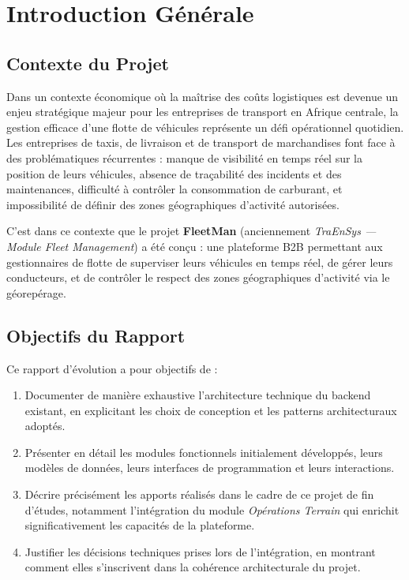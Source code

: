 \documentclass[12pt,a4paper]{report}
\begin{document}
\tableofcontents
\listoftables
\listoffigures

\chapter*{Introduction Générale}
\thispagestyle{fancy}

\section*{Contexte du Projet}

Dans un contexte économique où la maîtrise des coûts logistiques est devenue un enjeu stratégique majeur pour les entreprises de transport en Afrique centrale, la gestion efficace d'une flotte de véhicules représente un défi opérationnel quotidien. Les entreprises de taxis, de livraison et de transport de marchandises font face à des problématiques récurrentes : manque de visibilité en temps réel sur la position de leurs véhicules, absence de traçabilité des incidents et des maintenances, difficulté à contrôler la consommation de carburant, et impossibilité de définir des zones géographiques d'activité autorisées.

C'est dans ce contexte que le projet \textbf{FleetMan} (anciennement \textit{TraEnSys — Module Fleet Management}) a été conçu : une plateforme B2B permettant aux gestionnaires de flotte de superviser leurs véhicules en temps réel, de gérer leurs conducteurs, et de contrôler le respect des zones géographiques d'activité via le géorepérage.

\section*{Objectifs du Rapport}

Ce rapport d'évolution a pour objectifs de :

\begin{enumerate}[leftmargin=2cm]
  \item Documenter de manière exhaustive l'architecture technique du backend existant, en explicitant les choix de conception et les patterns architecturaux adoptés.
  \item Présenter en détail les modules fonctionnels initialement développés, leurs modèles de données, leurs interfaces de programmation et leurs interactions.
  \item Décrire précisément les apports réalisés dans le cadre de ce projet de fin d'études, notamment l'intégration du module \textit{Opérations Terrain} qui enrichit significativement les capacités de la plateforme.
  \item Justifier les décisions techniques prises lors de l'intégration, en montrant comment elles s'inscrivent dans la cohérence architecturale du projet.
\end{enumerate}
\end{document}

